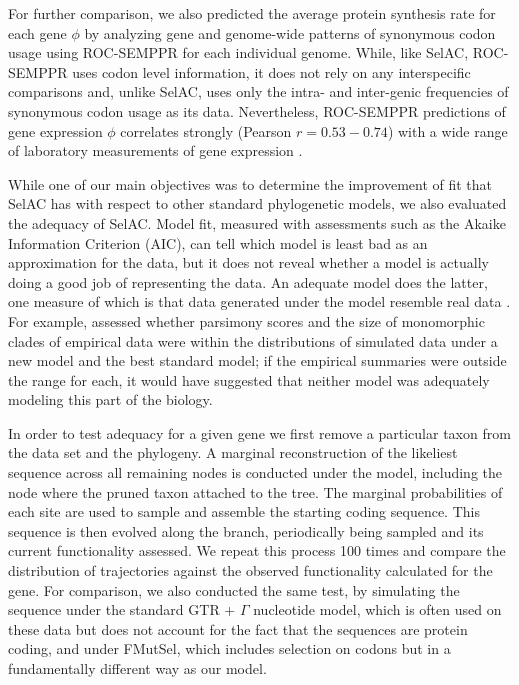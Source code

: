 \documentclass[onecolumn,letterpaper,fleqn,nogrid]{myMBE}%
\newcommand{\selac}{SelAC\xspace}
\begin{document}
For further comparison, we also predicted the average protein synthesis rate for each gene $\phi$ by analyzing gene and genome-wide patterns of synonymous codon usage using ROC-SEMPPR \citep{GilchristEtAl2015} for each individual genome.
While, like \selac, ROC-SEMPPR uses codon level information, it does not rely on any interspecific comparisons and, unlike \selac, uses only the intra- and inter-genic frequencies of synonymous codon usage as its data.
Nevertheless, ROC-SEMPPR predictions of gene expression $\phi$ correlates strongly (Pearson $r= 0.53-0.74$) with a wide range of laboratory measurements of gene expression \citep{GilchristEtAl2015}.

While one of our main objectives was to determine the improvement of fit that \selac has with respect to other standard phylogenetic models, we also evaluated the adequacy of \selac.
Model fit, measured with assessments such as the Akaike Information Criterion (AIC), can tell which model is least bad as an approximation for the data, but it does not reveal whether a model is actually doing a good job of representing the data. %
An adequate model does the latter, one measure of which is that data generated under the model resemble real data \citep{goldman1993statistical}.
For example, \citet{BeaulieuEtAl2013} assessed whether parsimony scores and the size of monomorphic clades of empirical data were within the distributions of simulated data under a new model and the best standard model; if the empirical summaries were outside the range for each, it would have suggested that neither model was adequately modeling this part of the biology.

In order to test adequacy for a given gene we first remove a particular taxon from the data set and the phylogeny.
A marginal reconstruction of the likeliest sequence across all remaining nodes is conducted under the model, including the node where the pruned taxon attached to the tree.
The marginal probabilities of each site are used to sample and assemble the starting coding sequence.
This sequence is then evolved along the branch, periodically being sampled and its current functionality assessed.
We repeat this process 100 times and compare the distribution of trajectories against the observed functionality calculated for the gene.
For comparison, we also conducted the same test, by simulating the sequence under the standard GTR + $\Gamma$ nucleotide model, which is often used on these data but does not account for the fact that the sequences are protein coding, and under FMutSel, which includes selection on codons but in a fundamentally different way as our model.
\end{document}
